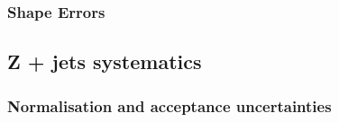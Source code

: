 
\subsubsection{Shape Errors}

\subsection{Z + jets systematics}
\label{sec:zjets-systs}


\subsubsection{Normalisation and acceptance uncertainties}




